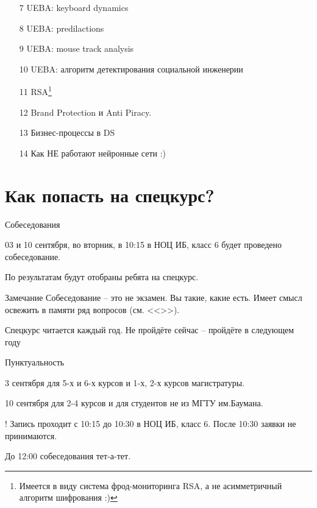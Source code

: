 \documentclass{beamer}
\newcommand{\рис}[1]{рис.\ref{#1}}
\newcommand{\Рис}[1]{Рис.\ref{#1}}
\newcommand{\таблицa}[1]{таблица~№\ref{#1}} %
\newcommand{\таблицы}[1]{таблицы~№\ref{#1}} %
\newcommand{\таблице}[1]{таблице~№\ref{#1}} %
\newcommand{\таблицу}[1]{таблицу~№\ref{#1}} %
\newcommand{\таблицей}[1]{таблицей~№\ref{#1}} %
\newcommand{\Таблицa}[1]{Таблица~№\ref{#1}} %
\newcommand{\Таблицы}[1]{Таблицы~№\ref{#1}} %
\newcommand{\Таблице}[1]{Таблице~№\ref{#1}} %
\newcommand{\Таблицу}[1]{Таблицу~№\ref{#1}} %
\newcommand{\Таблицей}[1]{Таблицей~№\ref{#1}} %
\begin{document}
  \begin{frame}
\begin{enumerate}
	\item[7] UEBA: keyboard dynamics
	\item[8] UEBA: predilactions
	\item[9] UEBA: mouse track analysis
	\item[10] UEBA: алгоритм детектирования социальной инженерии
	\item[11] RSA\footnote{Имеется в виду система фрод-мониторинга RSA, а не асимметричный алгоритм шифрования :)} 
	\item[12] Brand Protection и Anti Piracy.
	\item[13] Бизнес-процессы в DS
	\item[14] Как НЕ работают нейронные сети :)
\end{enumerate}
\end{frame}

  \section{Как попасть на спецкурс?}\label{section:how_to}
  
  \begin{frame}{Собеседования}
  
  03 и 10 сентября, во вторник, в 10:15 в НОЦ ИБ, класс 6
  будет проведено собеседование. 
  
  По результатам будут отобраны ребята на спецкурс.

   \begin{block}{Замечание}
   	Собеседование -- это не экзамен. Вы такие, какие есть. 
   	Имеет смысл освежить в памяти ряд вопросов 
   	(см. <<>>).
   	
   	Спецкурс читается каждый год. Не пройдёте сейчас -- 
   	пройдёте в следующем году
   \end{block}
  \end{frame}

  \begin{frame}{Пунктуальность}
  
  3 сентября для 5-х и 6-х курсов и 1-х, 2-х курсов магистратуры.	
  
  10 сентября для 2-4 курсов и для студентов не из МГТУ им.Баумана.
  
  \begin{block}{!}
  Запись проходит с 10:15 до 10:30 в НОЦ ИБ, класс 6.
  После 10:30 заявки не принимаются.
  \end{block}
  
  До 12:00 собеседования тет-а-тет.
  
  \end{frame}
  
\end{document}
